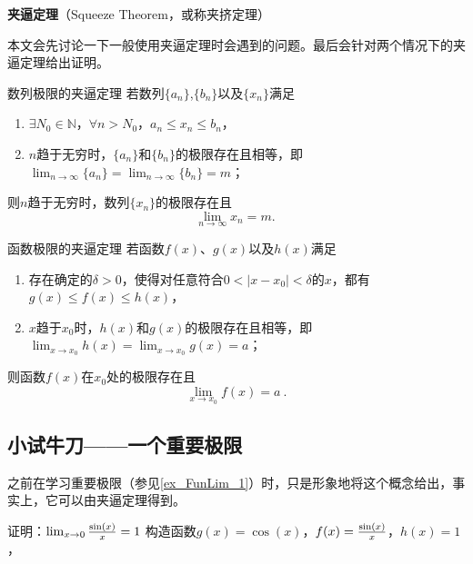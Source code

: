 
\begin{issues}
\issueDraft
\end{issues}
\textbf{夹逼定理}（Squeeze Theorem，或称夹挤定理）

本文会先讨论一下一般使用夹逼定理时会遇到的问题。最后会针对两个情况下的夹逼定理给出证明。

\begin{theorem}{数列极限的夹逼定理}\label{the_SquzTh_1}
若数列$\{a_n\}$,$\{b_n\}$以及$\{x_n\}$满足
\begin{enumerate}
\item $\exists N_0\in \mathbb{N}$，$\forall n>N_0$，$a_n\leq x_n\leq b_n$，
\item $n$趋于无穷时，$\{a_n\}$和$\{b_n\}$的极限存在且相等，即$\lim_{n\to\infty}\{a_n\}=\lim_{n\to\infty}\{b_n\}=m$；
\end{enumerate}
则$n$趋于无穷时，数列$\{x_n\}$的极限存在且
\begin{equation}
\lim_{n\to\infty}x_n =m.~
\end{equation}
\end{theorem}

\begin{theorem}{函数极限的夹逼定理}\label{the_SquzTh_2}
若函数$f(x)$、$g(x)$以及$h(x)$满足
\begin{enumerate}
\item 存在确定的$\delta>0$，使得对任意符合$0<|x-x_0|<\delta$的$x$，都有$g(x)\leq f(x)\leq h(x)$，
\item $x$趋于$x_0$时，$h(x)$和$g(x)$的极限存在且相等，即$\lim _{x\to x_0}h(x)=\lim _{x\to x_0}g(x)=a$；
\end{enumerate}
则函数$f(x)$在$x_0$处的极限存在且
\begin{equation}
\lim _{x\to x_0}f(x)=a~.
\end{equation}
\end{theorem}

\subsection{小试牛刀——一个重要极限}

之前在学习重要极限（参见\autoref{ex_FunLim_1}）时，只是形象地将这个概念给出，事实上，它可以由夹逼定理得到。
\begin{example}{证明：$\lim_{x\to0}{\sin(x)\over x}=1$}
构造函数$g(x)=\cos(x)$，$f(x)={\sin(x)\over x}$，$h(x)=1$，
\end{example}


